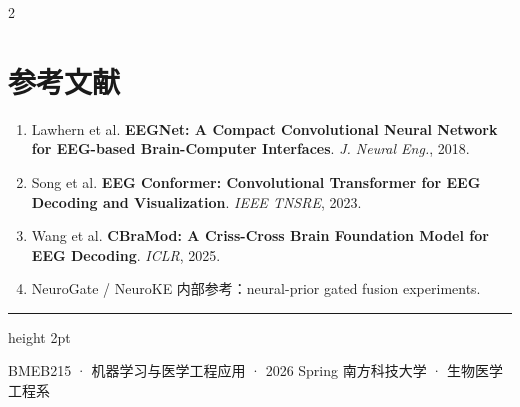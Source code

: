 \documentclass[12pt, a0paper]{article}
\renewcommand{\footnotesize}{\fontsize{15}{20}\selectfont}
\begin{document}
\begin{multicols}{2}
\vspace{1em}
\section*{参考文献}

{\footnotesize
\begin{enumerate}[leftmargin=2em]
    \item Lawhern et al. \textbf{EEGNet: A Compact Convolutional Neural Network for EEG-based Brain-Computer Interfaces}. \textit{J. Neural Eng.}, 2018.
    \item Song et al. \textbf{EEG Conformer: Convolutional Transformer for EEG Decoding and Visualization}. \textit{IEEE TNSRE}, 2023.
    \item Wang et al. \textbf{CBraMod: A Criss-Cross Brain Foundation Model for EEG Decoding}. \textit{ICLR}, 2025.
    \item NeuroGate / NeuroKE 内部参考：neural-prior gated fusion experiments.
\end{enumerate}
}

\end{multicols}

\vspace{4mm}
{\color{myblue}\hrule height 2pt}
\vspace{3mm}
\begin{center}
{\footnotesize\color{mygray}
    BMEB215 · 机器学习与医学工程应用 · 2026 Spring \hspace{3em}
    南方科技大学 · 生物医学工程系
}
\end{center}
\end{document}
